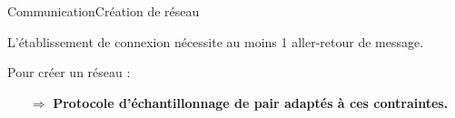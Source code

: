 \begin{frame}{Communication}{Création de réseau}

  \begin{minipage}{0.37\textwidth}
    L'établissement de connexion nécessite au moins 1 aller-retour de message.
  \end{minipage}
  \begin{minipage}{0.61\textwidth}
    \begin{center}
    
    \end{center}
  \end{minipage}

  \vspace{0.5cm}

  \begin{minipage}{0.6\textwidth}
    Pour créer un réseau : 
    \begin{itemize}
    \end{itemize}
  \end{minipage}
  \begin{minipage}{0.3\textwidth}
    \begin{center}
      
    \end{center}
  \end{minipage}
  
  
  \vspace{0.5cm}
  
  \large
  \begin{itemize}
  \item [$\Rightarrow$] \textbf{Protocole d'échantillonnage de pair adaptés à ces
      contraintes.}
  \end{itemize}
  
\end{frame}


